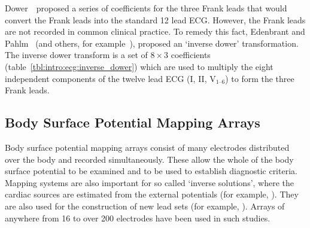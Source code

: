 Dower~\cite{Dower1980}\ proposed a series of coefficients for the three Frank
leads that would convert the Frank leads into the standard 12 lead ECG.
However, the Frank leads are not recorded in common clinical practice.
To remedy this fact, Edenbrant and Pahlm~\cite{Edenbrant1988} (and others, for
example~\cite{Uijen1988}), proposed an `inverse dower' transformation.
The inverse dower transform is a set of $8\times3$ coefficients
(table~\ref{tbl:intro:ecg:inverse_dower}) which are used to multiply the eight
independent components of the twelve lead ECG (I, II, $\text{V}_{\text{1--6}}$)
to form the three Frank leads.

\subsection{Body Surface Potential Mapping Arrays}

Body surface potential mapping arrays consist of many electrodes distributed
over the body and recorded simultaneously.
These allow the whole of the body surface potential to be examined and
to be used to establish diagnostic criteria.
Mapping systems are also important for so called `inverse solutions', where the
cardiac sources are estimated from the external potentials (for example,
\cite{Ramanathan2007}).
They are also used for the construction of new lead sets (for example, \cite{}).
Arrays of anywhere from 16 to over 200 electrodes have been used in such
studies.
